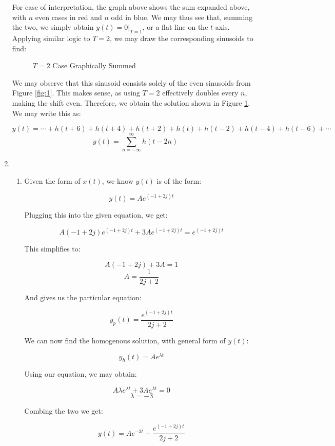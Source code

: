\begin{enumerate}
    For ease of interpretation, the graph above shows the sum expanded above, with $n$ even cases in red and $n$ odd in blue. We may thus see that, summing the two, we simply obtain $\boxed{y(t)=0\Big|_{T=1}}$, or a flat line on the $t$ axis. Applying similar logic to $T=2$, we may draw the corresponding sinusoids to find:

    \begin{figure}[H]
      \centering
      
      \caption{$T=2$ Case Graphically Summed}
      \label{fig:2}
    \end{figure}

    We may observe that this sinusoid consists solely of the even sinusoids from Figure \ref{fig:1}. This makes sense, as using $T=2$ effectively doubles every $n$, making the shift even. Therefore, we obtain the solution shown in Figure \ref{fig:2}. We may write this as:

    $$y(t)=\cdots+h(t+6)+h(t+4)+h(t+2)+h(t)+h(t-2)+h(t-4)+h(t-6)+\cdots$$
    $$\boxed{y(t)=\sum_{n=-\infty}^{\infty} h(t-2n)}$$

  \item

    \begin{enumerate}

      \item Given the form of $x(t)$, we know $y(t)$ is of the form:

        $$y(t)=Ae^{(-1+2j)t}$$

        Plugging this into the given equation, we get:

        $$A(-1+2j)e^{(-1+2j)t}+3Ae^{(-1+2j)t}=e^{(-1+2j)t}$$

        This simplifies to:

        $$A(-1+2j)+3A=1$$
        $$A=\frac{1}{2j+2}$$

        And gives us the particular equation:

        $$y_p(t)=\frac{e^{(-1+2j)t}}{2j+2}$$

        We can now find the homogenous solution, with general form of $y(t)$:

        $$y_h(t)=Ae^{\lambda t}$$

        Using our equation, we may obtain:

        $$A\lambda e^{\lambda t}+3Ae^{\lambda t}=0$$
        $$\lambda=-3$$

        Combing the two we get:

        $$y(t)=Ae^{-3 t}+\frac{e^{(-1+2j)t}}{2j+2}$$


\end{enumerate}
\end{enumerate}
